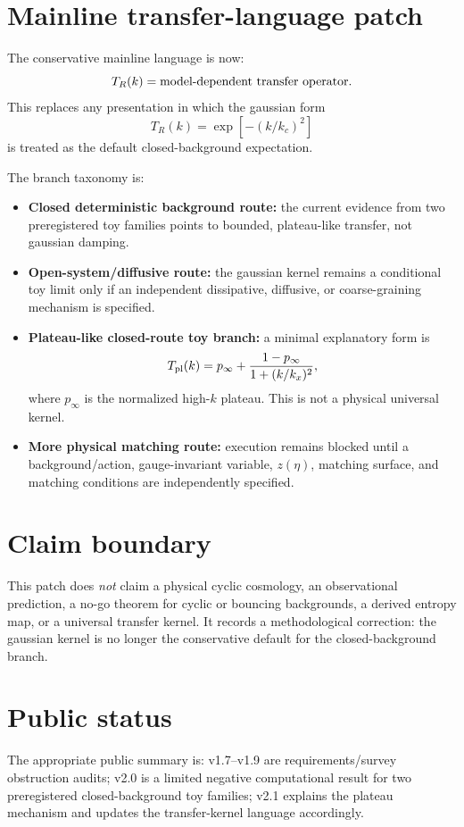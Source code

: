 \documentclass[11pt]{article}
\begin{document}
\section{Mainline transfer-language patch}

The conservative mainline language is now:
\begin{equation}
T_R(k) = \hbox{model-dependent transfer operator.}
\end{equation}
This replaces any presentation in which the gaussian form
\begin{equation}
T_R(k)=\exp[-(k/k_c)^2]
\end{equation}
is treated as the default closed-background expectation.

The branch taxonomy is:
\begin{itemize}
\item \textbf{Closed deterministic background route:} the current evidence from two preregistered toy families points to bounded, plateau-like transfer, not gaussian damping.
\item \textbf{Open-system/diffusive route:} the gaussian kernel remains a conditional toy limit only if an independent dissipative, diffusive, or coarse-graining mechanism is specified.
\item \textbf{Plateau-like closed-route toy branch:} a minimal explanatory form is
\begin{equation}
T_{\rm pl}(k)=p_\infty+\frac{1-p_\infty}{1+(k/k_x)^2},
\end{equation}
where $p_\infty$ is the normalized high-$k$ plateau. This is not a physical universal kernel.
\item \textbf{More physical matching route:} execution remains blocked until a background/action, gauge-invariant variable, $z(\eta)$, matching surface, and matching conditions are independently specified.
\end{itemize}

\section{Claim boundary}

This patch does \emph{not} claim a physical cyclic cosmology, an observational prediction, a no-go theorem for cyclic or bouncing backgrounds, a derived entropy map, or a universal transfer kernel. It records a methodological correction: the gaussian kernel is no longer the conservative default for the closed-background branch.

\section{Public status}

The appropriate public summary is: v1.7--v1.9 are requirements/survey obstruction audits; v2.0 is a limited negative computational result for two preregistered closed-background toy families; v2.1 explains the plateau mechanism and updates the transfer-kernel language accordingly.
\end{document}
